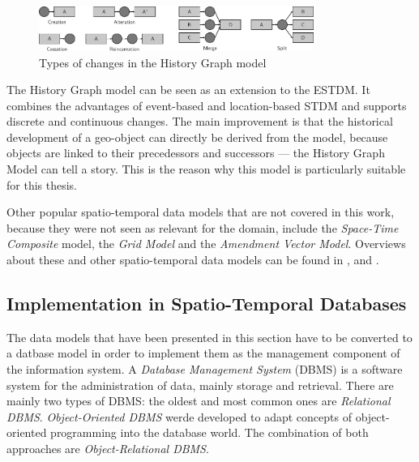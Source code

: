 \begin{figure}[ht]
  \vspace{1em}
  \centering
  \includegraphics[width=0.8\textwidth]{graphics/basics/stdm/history_graph_changes}
  \caption{Types of changes in the History Graph model}
  \label{fig:history_graph_changes}
\end{figure}

The History Graph model can be seen as an extension to the ESTDM. It combines the advantages of event-based and location-based STDM and supports discrete and continuous changes. The main improvement is that the historical development of a geo-object can directly be derived from the model, because objects are linked to their precedessors and successors --- the History Graph Model can tell a story. This is the reason why this model is particularly suitable for this thesis.


\vspace{1em}
Other popular spatio-temporal data models that are not covered in this work, because they were not seen as relevant for the domain, include the \emph{Space-Time Composite} model, the \emph{Grid Model} and the \emph{Amendment Vector Model}. Overviews about these and other spatio-temporal data models can be found in \cite{zhao11}, \cite{pelekis04stdms} and \cite{peuquet99}.



\subsection{Implementation in Spatio-Temporal Databases} %
\label{sub:implementation_in_spatio_temporal_databases}

The data models that have been presented in this section have to be converted to a datbase model in order to implement them as the management component of the information system. A \emph{Database Management System} (DBMS) is a software system for the administration of data, mainly storage and retrieval. There are mainly two types of DBMS: the oldest and most common ones are \emph{Relational DBMS}. \emph{Object-Oriented DBMS} werde developed to adapt concepts of object-oriented programming into the database world. The combination of both approaches are \emph{Object-Relational DBMS}.

